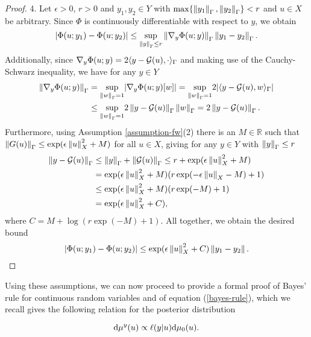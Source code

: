 \begin{proof}
  4. Let $\epsilon > 0$, $r > 0$ and $y_1, y_2 \in Y$ with $\max\{\left\lVert y_1\right\rVert_\Gamma, \left\lVert y_2\right\rVert_\Gamma\} < r$ and $u \in X$ be arbitrary. Since $\Phi$ is continuously differentiable with respect to $y$, we obtain
  \begin{equation*}
    |\Phi(u; y_1) - \Phi(u; y_2)|
    \le \underset{\left\lVert y\right\rVert_\Gamma \le r}{\sup}\left\lVert\nabla_y \Phi(u; y)\right\rVert_\Gamma\left\lVert y_1 - y_2\right\rVert_\Gamma.
  \end{equation*}
  Additionally, since $\nabla_y \Phi(u; y) = 2\langle y - \mathcal{G}(u), \cdot\rangle_\Gamma$ and making use of the Cauchy-Schwarz inequality, we have for any $y \in Y$
  \begin{align*}
    \left\lVert\nabla_y \Phi(u; y)\right\rVert_\Gamma
    &= \underset{\left\lVert w\right\rVert_\Gamma = 1}{\sup} |\nabla_y \Phi(u; y)[w]|
    = \underset{\left\lVert w\right\rVert_\Gamma = 1}{\sup} 2|\langle y - \mathcal{G}(u), w\rangle_\Gamma|
    \\ &\le \underset{\left\lVert w\right\rVert_\Gamma = 1}{\sup}2\left\lVert y - \mathcal{G}(u)\right\rVert_\Gamma\left\lVert w\right\rVert_\Gamma = 2\left\lVert y - \mathcal{G}(u)\right\rVert_\Gamma.
  \end{align*}
  Furthermore, using Assumption \ref{assumption-fw}(2) there is an $M \in \mathbb{R}$ such that $\left\lVert G(u)\right\rVert_\Gamma \le \exp(\epsilon \left\lVert u\right\rVert_X^2 + M)$ for all $u \in X$, giving for any $y \in Y$ with $\left\lVert y\right\rVert_\Gamma \le r$
  \begin{align*}
    \left\lVert y - \mathcal{G}(u)\right\rVert_\Gamma
    &\le \left\lVert y\right\rVert_\Gamma + \left\lVert\mathcal{G}(u)\right\rVert_\Gamma
    \le r + \exp(\epsilon\left\lVert u\right\rVert_X^2 + M)\\
    &= \exp(\epsilon\left\lVert u\right\rVert_X^2 + M)(r \exp(-\epsilon\left\lVert u\right\rVert_X - M) + 1)\\
    &\le \exp(\epsilon\left\lVert u\right\rVert_X^2 + M)(r \exp(-M) + 1)\\
    &= \exp(\epsilon\left\lVert u\right\rVert_X^2 + C),
  \end{align*}
  where $C = M + \log(r \exp(-M) + 1)$. All together, we obtain the desired bound
  \begin{equation*}
    |\Phi(u; y_1) - \Phi(u; y_2)| \le \exp(\epsilon \left\lVert u\right\rVert_X^2 + C)\left\lVert y_1 - y_2\right\rVert.
  \end{equation*}
\end{proof}

Using these assumptions, we can now proceed to provide a formal proof of Bayes' rule for continuous random variables and of equation (\ref{bayes-rule}), which we recall gives the following relation for the posterior distribution

\begin{equation*}
  \text{d}\mu^y(u) \propto \ell(y|u)\text{d}\mu_0(u).
\end{equation*}


